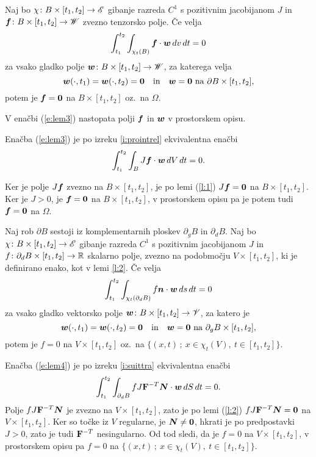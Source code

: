 \begin{lema} \label{lema3}
	Naj bo $\chi\colon B\times[t_1,t_2]\to\mathscr E$ gibanje razreda $C^1$ s pozitivnim jacobijanom $J$ in
	$\boldsymbol f\colon B\times[t_1,t_2]\to\mathscr W$ zvezno tenzorsko polje. Če velja
	\begin{equation} \label{e:lem3}
		\int_{t_1}^{t_2}\int_{\chi_t(B)}\boldsymbol f\cdot \boldsymbol w \,dv\,dt=0
	\end{equation}
	za vsako gladko polje $\boldsymbol w\colon B\times[t_1,t_2]\to\mathscr W$, za katerega velja
	\[
		\boldsymbol w(\cdot,t_1)=\boldsymbol w(\cdot,t_2)=\boldsymbol 0\quad\textrm{in}
		\quad\boldsymbol w=\boldsymbol 0\ \textrm{na}\ \partial B\times[t_1,t_2],
	\]
	potem je $\boldsymbol f=\boldsymbol 0$ na $B\times[t_1,t_2]$ oz.~na $\Omega$.
\end{lema}
V enačbi (\ref{e:lem3}) nastopata polji $\boldsymbol f$ in $\boldsymbol w$ v prostorskem opisu.

\proof
	Enačba (\ref{e:lem3}) je po izreku \ref{i:prointrel} ekvivalentna enačbi
	\[ \int_{t_1}^{t_2}\int_{B}J\boldsymbol f\cdot \boldsymbol w \,dV\,dt=0. \]
	
	Ker je polje $J\boldsymbol f$ zvezno na $B\times[t_1,t_2]$, je
	po lemi (\ref{l:1}) $J\boldsymbol f=\boldsymbol 0$
	na $B\times[t_1,t_2]$. Ker je $J>0$, je $\boldsymbol f=\boldsymbol 0$ na $B\times[t_1,t_2]$,
	v prostorskem opisu pa je potem tudi $\boldsymbol f=\boldsymbol 0$ na $\Omega$.
\endproof

\begin{lema} \label{lema4}
	Naj rob $\partial B$ sestoji iz komplementarnih ploskev $\partial_g B$ in $\partial_d B$.
	Naj bo $\chi\colon B\times[t_1,t_2]\to\mathscr E$ gibanje razreda $C^1$ s pozitivnim jacobijanom $J$ in
	$f\colon\partial_d B\times[t_1,t_2]\to\mathbb R$ skalarno polje, zvezno na podobmočju $V\times[t_1,t_2]$,
	ki je definirano enako, kot v lemi \ref{l:2}.
	Če velja
	\begin{equation}\label{e:lem4}
		\int_{t_1}^{t_2}\int_{\chi_t(\partial_d B)}f\boldsymbol n\cdot\boldsymbol w\,ds\,dt=0
	\end{equation}
	za vsako gladko vektorsko polje $\boldsymbol w\colon B\times[t_1,t_2]\to\mathscr V$, za katero je
	\[
		\boldsymbol w(\cdot,t_1)=\boldsymbol w(\cdot,t_2)=\boldsymbol 0\quad\textrm{in}
		\quad\boldsymbol w=\boldsymbol 0\ \textrm{na}\ \partial_g B\times[t_1,t_2],
	\]
	potem je $f=0$ na $V\times[t_1,t_2]$ oz.~na $\{(x,t)\,;\ x\in\chi_t(V),\ t\in[t_1,t_2] \}$.
\end{lema}

\proof
	Enačba (\ref{e:lem4}) je po izreku \ref{i:suittra} ekvivalentna enačbi
	\[ \int_{t_1}^{t_2}\int_{\partial_d B}fJ\mathbf F^{-T}\boldsymbol N\cdot\boldsymbol w\,dS\,dt=0. \]
	Polje $fJ\mathbf F^{-T}\boldsymbol N$ je zvezno na $V\times[t_1,t_2]$,
	zato je po lemi (\ref{l:2}) $fJ\mathbf F^{-T}\boldsymbol N=\boldsymbol 0$ na $V\times[t_1,t_2]$.
	Ker so točke iz $V$ regularne, je $\boldsymbol N\neq \boldsymbol 0$, hkrati je po predpostavki $J>0$,
	zato je tudi $\mathbf F^{-T}$ nesingularno. Od tod sledi, da je $f=0$ na $V\times[t_1,t_2]$,
	v prostorskem opisu pa $f=0$ na $\{(x,t)\,;\ x\in\chi_t(V),\ t\in[t_1,t_2] \}$.
\endproof


